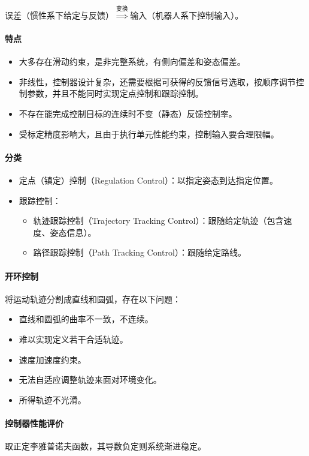 \documentclass[
12pt, %
a4paper, 
oneside, %
headinclude,footinclude, %
]{scrartcl}
\begin{document}
误差（惯性系下给定与反馈）$ \overset{\text{变换}}{\Longrightarrow} $输入（机器人系下控制输入）。 
\paragraph{特点}
\begin{itemize}
\item 大多存在滑动约束，是非完整系统，有侧向偏差和姿态偏差。
\item 非线性，控制器设计复杂，还需要根据可获得的反馈信号选取，按顺序调节控制参数，并且不能同时实现定点控制和跟踪控制。
\item 不存在能完成控制目标的连续时不变（静态）反馈控制率。
\item 受标定精度影响大，且由于执行单元性能约束，控制输入要合理限幅。
\end{itemize}
\paragraph{分类}
\begin{itemize}
\item 定点（镇定）控制（Regulation Control）：以指定姿态到达指定位置。
\item 跟踪控制：
\begin{itemize}
\item 轨迹跟踪控制（Trajectory Tracking Control）：跟随给定轨迹（包含速度、姿态信息）。
\item 路径跟踪控制（Path Tracking Control）：跟随给定路线。
\end{itemize}
\end{itemize}
\paragraph{开环控制}
将运动轨迹分割成直线和圆弧，存在以下问题：
\begin{itemize}
\item 直线和圆弧的曲率不一致，不连续。
\item 难以实现定义若干合适轨迹。
\item 速度加速度约束。
\item 无法自适应调整轨迹来面对环境变化。
\item 所得轨迹不光滑。
\end{itemize}
\paragraph{控制器性能评价}
取正定李雅普诺夫函数，其导数负定则系统渐进稳定。
\end{document}
